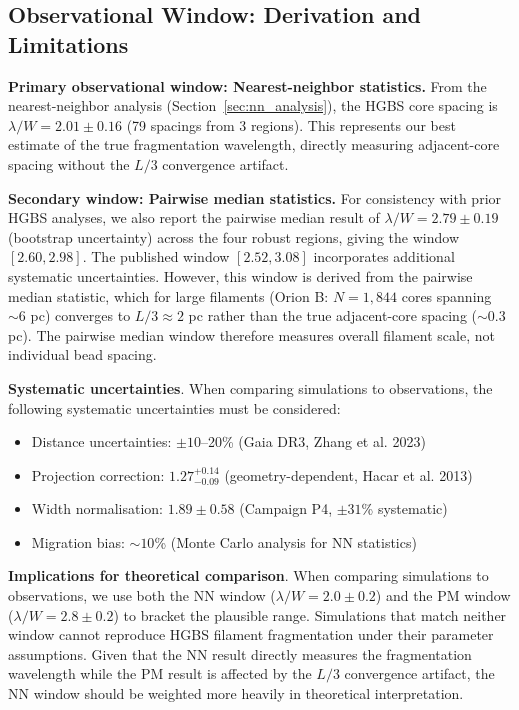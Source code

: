 \documentclass[twocolumn,usenatbib]{mnras}
\begin{document}
\subsection{Observational Window: Derivation and Limitations}

\textbf{Primary observational window: Nearest-neighbor statistics.}
From the nearest-neighbor analysis (Section~\ref{sec:nn_analysis}), the HGBS core spacing is $\lambda/W = 2.01 \pm 0.16$ (79 spacings from 3 regions). This represents our best estimate of the true fragmentation wavelength, directly measuring adjacent-core spacing without the $L/3$ convergence artifact.

\noindent\textbf{Secondary window: Pairwise median statistics.}
For consistency with prior HGBS analyses, we also report the pairwise median result of $\lambda/W = 2.79 \pm 0.19$ (bootstrap uncertainty) across the four robust regions, giving the window $[2.60, 2.98]$. The published window $[2.52, 3.08]$ incorporates additional systematic uncertainties. However, this window is derived from the pairwise median statistic, which for large filaments (Orion B: $N = 1,844$ cores spanning $\sim 6$ pc) converges to $L/3 \approx 2$ pc rather than the true adjacent-core spacing ($\sim 0.3$ pc). The pairwise median window therefore measures overall filament scale, not individual bead spacing.

\noindent\textbf{Systematic uncertainties}. When comparing simulations to observations, the following systematic uncertainties must be considered:
\begin{itemize}
\item Distance uncertainties: $\pm 10$--20\% (Gaia DR3, Zhang et al. 2023)
\item Projection correction: $1.27^{+0.14}_{-0.09}$ (geometry-dependent, Hacar et al. 2013)
\item Width normalisation: $1.89 \pm 0.58$ (Campaign P4, $\pm 31$\% systematic)
\item Migration bias: $\sim 10$\% (Monte Carlo analysis for NN statistics)
\end{itemize}

\noindent\textbf{Implications for theoretical comparison}. When comparing simulations to observations, we use both the NN window ($\lambda/W = 2.0 \pm 0.2$) and the PM window ($\lambda/W = 2.8 \pm 0.2$) to bracket the plausible range. Simulations that match neither window cannot reproduce HGBS filament fragmentation under their parameter assumptions. Given that the NN result directly measures the fragmentation wavelength while the PM result is affected by the $L/3$ convergence artifact, the NN window should be weighted more heavily in theoretical interpretation.
\end{document}
